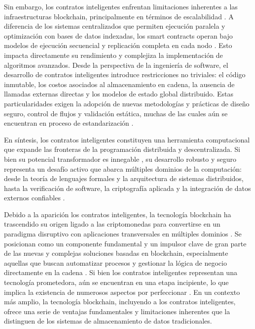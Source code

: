 Sin embargo, los contratos inteligentes enfrentan limitaciones inherentes a las infraestructuras blockchain, principalmente en términos de escalabilidad \cite{kalajdjieski2023databases}. A diferencia de los sistemas centralizados que permiten ejecución paralela y optimización con bases de datos indexadas, los smart contracts operan bajo modelos de ejecución secuencial y replicación completa en cada nodo \cite{taherdoost2023smart}. Esto impacta directamente su rendimiento y complejiza la implementación de algoritmos avanzados. Desde la perspectiva de la ingeniería de software, el desarrollo de contratos inteligentes introduce restricciones no triviales: el código inmutable, los costos asociados al almacenamiento en cadena, la ausencia de llamadas externas directas y los modelos de estado global distribuido. Estas particularidades exigen la adopción de nuevas metodologías y prácticas de diseño seguro, control de flujos y validación estática, muchas de las cuales aún se encuentran en proceso de estandarización \cite{taherdoost2023smart, cepal2021economia}.

En síntesis, los contratos inteligentes constituyen una herramienta computacional que expande las fronteras de la programación distribuida y descentralizada. Si bien su potencial transformador es innegable \cite{taherdoost2023smart}, su desarrollo robusto y seguro representa un desafío activo que abarca múltiples dominios de la computación: desde la teoría de lenguajes formales \cite{hoskinson2017we} y la arquitectura de sistemas distribuidos, hasta la verificación de software, la criptografía aplicada y la integración de datos externos confiables \cite{taherdoost2023smart}.

Debido a la aparición los contratos inteligentes, la tecnología blockchain ha trascendido su origen ligado a las criptomonedas para convertirse en un paradigma disruptivo con aplicaciones transversales en múltiples dominios \cite{bartolomeo2020introduccion, vaigandla2023review}. Se posicionan como un componente fundamental y un impulsor clave de gran parte de las nuevas y complejas soluciones basadas en blockchain, especialmente aquellas que buscan automatizar procesos y gestionar la lógica de negocio directamente en la cadena \cite{sharabati2024blockchain}. Si bien los contratos inteligentes representan una tecnología prometedora, aún se encuentran en una etapa incipiente, lo que implica la existencia de numerosos aspectos por perfeccionar \cite{taherdoost2023smart}. En un contexto más amplio, la tecnología blockchain, incluyendo a los contratos inteligentes, ofrece una serie de ventajas fundamentales y limitaciones inherentes que la distinguen de los sistemas de almacenamiento de datos tradicionales.

